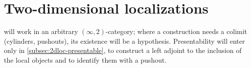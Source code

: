 \section{Two-dimensional localizations}
\label{sec:2dloc}

%
 will work in an arbitrary $(\infty,2)$-category; where a construction needs a colimit (cylinders, pushouts), its existence will be a hypothesis. Presentability will enter only in \cref{subsec:2dloc-presentable}, to construct a left adjoint to the inclusion of the local objects and to identify them with a pushout.






